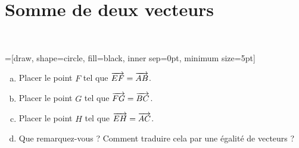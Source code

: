 \documentclass[11pt]{article}
\begin{document}
\setcounter{section}{1}
\section{Somme de deux vecteurs}

\begin{activite}~

  \begin{center}
=[draw, shape=circle, fill=black, inner sep=0pt, minimum size=5pt]
\end{center}

\begin{enumerate}[(a)]
  \item Placer le point $F$ tel que $\overrightarrow{EF}=\overrightarrow{AB}$.
  \item Placer le point $G$ tel que $\overrightarrow{FG}=\overrightarrow{BC}$.
  \item Placer le point $H$ tel que $\overrightarrow{EH}=\overrightarrow{AC}$.
  \item Que remarquez-vous ? Comment traduire cela par une égalité de vecteurs ?
\end{enumerate}
\end{activite}
\end{document}
